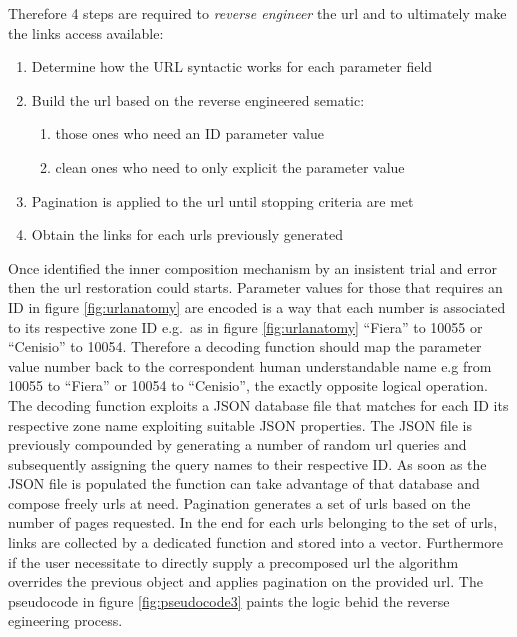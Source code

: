 \documentclass[
  12pt,
  a4paper,
  oneside]{book}
\providecommand{\tightlist}{%
  \setlength{\itemsep}{0pt}\setlength{\parskip}{0pt}}
\theoremstyle{definition}
\theoremstyle{definition}
\theoremstyle{definition}
\theoremstyle{remark}
\begin{document}
Therefore 4 steps are required to \emph{reverse engineer} the url \citeyearpar{automateddatacollection} and to ultimately make the links access available:

\begin{enumerate}
\def\labelenumi{\arabic{enumi}.}
\tightlist
\item
  Determine how the URL syntactic works for each parameter field
\item
  Build the url based on the reverse engineered sematic:

  \begin{enumerate}
  \def\labelenumii{\alph{enumii}.}
  \tightlist
  \item
    those ones who need an ID parameter value
  \item
    clean ones who need to only explicit the parameter value
  \end{enumerate}
\item
  Pagination is applied to the url until stopping criteria are met
\item
  Obtain the links for each urls previously generated
\end{enumerate}

Once identified the inner composition mechanism by an insistent trial and error then the url restoration could starts. Parameter values for those that requires an ID in figure \ref{fig:urlanatomy} are encoded is a way that each number is associated to its respective zone ID e.g.~as in figure \ref{fig:urlanatomy} ``Fiera'' to 10055 or ``Cenisio'' to 10054. Therefore a decoding function should map the parameter value number back to the correspondent human understandable name e.g from 10055 to ``Fiera'' or 10054 to ``Cenisio'', the exactly opposite logical operation. The decoding function exploits a JSON database file that matches for each ID its respective zone name exploiting suitable JSON properties. The JSON file is previously compounded by generating a number of random url queries and subsequently assigning the query names to their respective ID. As soon as the JSON file is populated the function can take advantage of that database and compose freely urls at need. Pagination generates a set of urls based on the number of pages requested. In the end for each urls belonging to the set of urls, links are collected by a dedicated function and stored into a vector. Furthermore if the user necessitate to directly supply a precomposed url the algorithm overrides the previous object and applies pagination on the provided url. The pseudocode in figure \ref{fig:pseudocode3} paints the logic behid the reverse egineering process.
\end{document}

